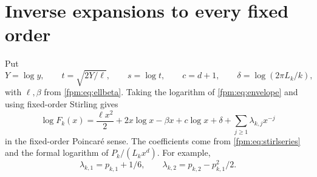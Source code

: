 \documentclass[11pt]{article}
\theoremstyle{definition}\newtheorem{definition}[theorem]{Definition}
\theoremstyle{remark}\newtheorem{remark}[theorem]{Remark}
\begin{document}
\section{Inverse expansions to every fixed order}\label{fpm:sec:inverseorders}
Put
\[
 Y=\log y,\qquad t=\sqrt{2Y/\ell},\qquad s=\log t,
 \qquad c=d+1,\qquad \delta=\log(2\pi L_k/k),
\]
with $\ell,\beta$ from \eqref{fpm:eq:ellbeta}. Taking the logarithm of \eqref{fpm:eq:envelope} and using fixed-order Stirling gives
\begin{equation}\label{fpm:eq:logF}
 \log F_k(x)=\frac{\ell x^2}{2}+2x\log x-\beta x
 +c\log x+\delta+\sum_{j\ge1}\lambda_{k,j}x^{-j}
\end{equation}
in the fixed-order Poincar\'e sense. The coefficients come from \eqref{fpm:eq:stirlseries} and the formal logarithm of $P_k/(L_kx^d)$. For example,
\[
 \lambda_{k,1}=p_{k,1}+1/6,\qquad
 \lambda_{k,2}=p_{k,2}-p_{k,1}^2/2.
\]
\end{document}
